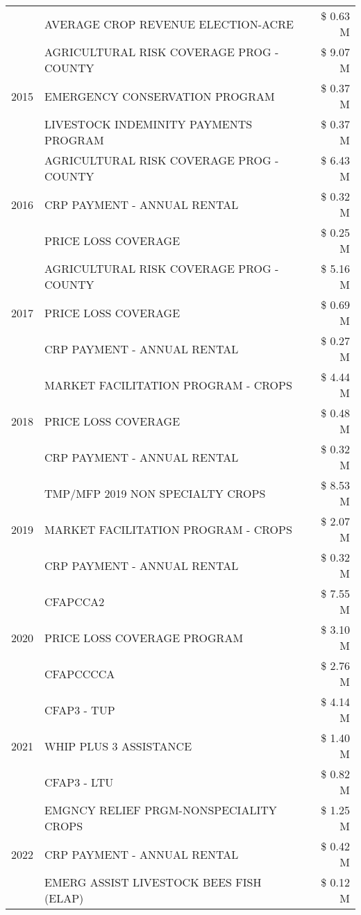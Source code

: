 \begin{tabular}{llr}
 & AVERAGE CROP REVENUE ELECTION-ACRE & \$ 0.63 M \\
\cline{1-3}
\multirow[t]{3}{*}{2015} & AGRICULTURAL RISK COVERAGE PROG - COUNTY & \$ 9.07 M \\
 & EMERGENCY CONSERVATION PROGRAM & \$ 0.37 M \\
 & LIVESTOCK INDEMINITY PAYMENTS PROGRAM & \$ 0.37 M \\
\cline{1-3}
\multirow[t]{3}{*}{2016} & AGRICULTURAL RISK COVERAGE PROG - COUNTY & \$ 6.43 M \\
 & CRP PAYMENT - ANNUAL RENTAL & \$ 0.32 M \\
 & PRICE LOSS COVERAGE & \$ 0.25 M \\
\cline{1-3}
\multirow[t]{3}{*}{2017} & AGRICULTURAL RISK COVERAGE PROG - COUNTY & \$ 5.16 M \\
 & PRICE LOSS COVERAGE & \$ 0.69 M \\
 & CRP PAYMENT - ANNUAL RENTAL & \$ 0.27 M \\
\cline{1-3}
\multirow[t]{3}{*}{2018} & MARKET FACILITATION PROGRAM - CROPS & \$ 4.44 M \\
 & PRICE LOSS COVERAGE & \$ 0.48 M \\
 & CRP PAYMENT - ANNUAL RENTAL & \$ 0.32 M \\
\cline{1-3}
\multirow[t]{3}{*}{2019} & TMP/MFP 2019 NON SPECIALTY CROPS & \$ 8.53 M \\
 & MARKET FACILITATION PROGRAM - CROPS & \$ 2.07 M \\
 & CRP PAYMENT - ANNUAL RENTAL & \$ 0.32 M \\
\cline{1-3}
\multirow[t]{3}{*}{2020} & CFAPCCA2 & \$ 7.55 M \\
 & PRICE LOSS COVERAGE PROGRAM & \$ 3.10 M \\
 & CFAPCCCCA & \$ 2.76 M \\
\cline{1-3}
\multirow[t]{3}{*}{2021} & CFAP3 - TUP & \$ 4.14 M \\
 & WHIP PLUS 3 ASSISTANCE & \$ 1.40 M \\
 & CFAP3 - LTU & \$ 0.82 M \\
\cline{1-3}
\multirow[t]{3}{*}{2022} & EMGNCY RELIEF PRGM-NONSPECIALITY CROPS & \$ 1.25 M \\
 & CRP PAYMENT - ANNUAL RENTAL & \$ 0.42 M \\
 & EMERG ASSIST LIVESTOCK BEES FISH (ELAP) & \$ 0.12 M \\
\cline{1-3}
\bottomrule
\end{tabular}
